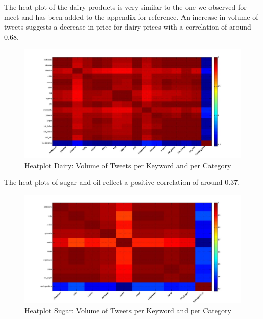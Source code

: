  
 
The heat plot of the dairy products is very similar to the one we observed for meet and has been added to the appendix for reference. An increase in volume of tweets suggests a decrease in price for dairy prices with a correlation of around 0.68. 

\begin{figure}[H]
        \centering
         \includegraphics[width=1\textwidth ]{img/anal/dairy_heatplot}
              
        \caption{Heatplot Dairy: Volume of Tweets per Keyword and per Category}
        \label{fig:distribution}
\end{figure}
 
The heat plots of sugar and oil reflect a positive correlation of around 0.37. 

\begin{figure}[H]
        \centering
         \includegraphics[width=1\textwidth ]{img/anal/sugar_heatplot}
              
        \caption{Heatplot Sugar: Volume of Tweets per Keyword and per Category}
        \label{fig:sugar_heat}
\end{figure}

